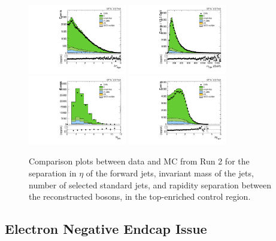 \begin{figure}[htbp]
  \centering
  \includegraphics[width=0.3825\textwidth]{fig/controlPlots/CR_b1_allL_allP_allC_allD_Run2_lnujj_vbfDEta.pdf}
  \includegraphics[width=0.3825\textwidth]{fig/controlPlots/CR_b1_allL_allP_allC_allD_Run2_lnujj_vbfMass.pdf}\\
  \includegraphics[width=0.3825\textwidth]{fig/controlPlots/CR_b1_allL_allP_allC_allD_Run2_lnujj_nJets.pdf}
  \includegraphics[width=0.3825\textwidth]{fig/controlPlots/CR_b1_allL_allP_allC_allD_Run2_dy.pdf}\\
  \caption{
    Comparison plots between data and MC from Run 2 for the separation in $\eta$ of the \VBF forward jets, invariant mass of the \VBF jets, number of selected standard jets, and rapidity separation between the reconstructed bosons, in the top-enriched control region.
  }
  \label{fig:CR_controlPlotsRun2_4}
\end{figure}

\subsection{Electron Negative Endcap Issue}

